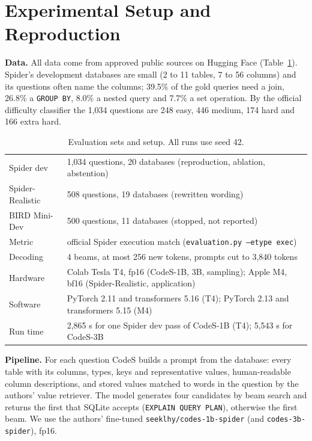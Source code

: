 \documentclass[conference]{IEEEtran}
\begin{document}
\section{Experimental Setup and Reproduction}
\label{sec:repro}
\textbf{Data.} All data come from approved public sources on Hugging Face (Table~\ref{tab:setup}). Spider's development databases are small (2 to 11 tables, 7 to 56 columns) and its questions often name the columns; 39.5\% of the gold queries need a join, 26.8\% a \texttt{GROUP BY}, 8.0\% a nested query and 7.7\% a set operation. By the official difficulty classifier the 1,034 questions are 248 easy, 446 medium, 174 hard and 166 extra hard.

\begin{table}[t]
\centering
\caption{Evaluation sets and setup. All runs use seed 42.}
\label{tab:setup}
\small\setlength{\tabcolsep}{3pt}
\begin{tabular}{@{}lp{5.2cm}@{}}
\toprule
Spider dev & 1,034 questions, 20 databases (reproduction, ablation, abstention) \\
Spider-Realistic & 508 questions, 19 databases (rewritten wording) \\
BIRD Mini-Dev & 500 questions, 11 databases (stopped, not reported) \\
Metric & official Spider execution match (\texttt{evaluation.py --etype exec}) \\
Decoding & 4 beams, at most 256 new tokens, prompts cut to 3,840 tokens \\
Hardware & Colab Tesla T4, fp16 (CodeS-1B, 3B, sampling); Apple M4, bf16 (Spider-Realistic, application) \\
Software & PyTorch 2.11 and transformers 5.16 (T4); PyTorch 2.13 and transformers 5.15 (M4) \\
Run time & 2,865 s for one Spider dev pass of CodeS-1B (T4); 5,543 s for CodeS-3B \\
\bottomrule
\end{tabular}
\end{table}

\textbf{Pipeline.} For each question CodeS builds a prompt from the database: every table with its columns, types, keys and representative values, human-readable column descriptions, and stored values matched to words in the question by the authors' value retriever. The model generates four candidates by beam search and returns the first that SQLite accepts (\texttt{EXPLAIN QUERY PLAN}), otherwise the first beam. We use the authors' fine-tuned \texttt{seeklhy/codes-1b-spider} (and \texttt{codes-3b-spider}), fp16.
\end{document}
